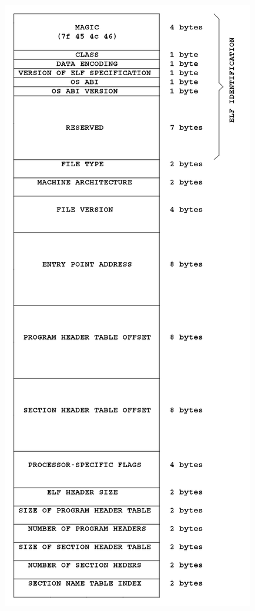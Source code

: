 \documentclass[11pt]{book}
\begin{document}
\begin{minipage}{0.5\textwidth}
\centering
\includegraphics[width=\textwidth]{pic/elf_header.png}
\end{minipage}
\end{document}
